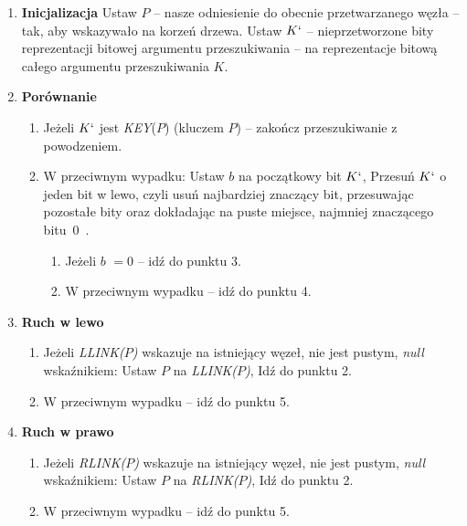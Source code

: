 	\begin{enumerate}
		\item \textbf{Inicjalizacja} \newline 
		Ustaw $P$ -- nasze odniesienie do obecnie przetwarzanego węzła -- tak, aby wskazywało na korzeń drzewa. \newline
		Ustaw $K`$ -- nieprzetworzone bity reprezentacji bitowej argumentu przeszukiwania -- na reprezentacje bitową całego argumentu przeszukiwania $K$.
		\item \textbf{Porównanie} 
		\begin{enumerate}
			\item Jeżeli $K`$ jest \emph{KEY}($P$) (kluczem $P$) -- zakończ przeszukiwanie z powodzeniem.
			\item W przeciwnym wypadku: \newline
			Ustaw $b$ na początkowy bit $K`$, \newline
			Przesuń $K`$ o jeden bit w lewo, czyli usuń najbardziej znaczący bit, przesuwając pozostałe bity oraz dokładając na puste miejsce, najmniej znaczącego bitu~$0$~\cite{inteviewCakeJavaBitShifting}.
			\begin{enumerate}
				\item Jeżeli $b$ $=0$ -- idź do punktu 3.
				\item W przeciwnym wypadku -- idź do punktu 4.
			\end{enumerate}
		\end{enumerate}
		\item \textbf{Ruch w lewo} 
		\begin{enumerate}
			\item Jeżeli \emph{LLINK($P$)} wskazuje na istniejący węzeł, nie jest pustym, \emph{null} wskaźnikiem: \newline
			Ustaw $P$ na \emph{LLINK($P$)}, \newline
			Idź do punktu 2.
			\item W przeciwnym wypadku -- idź do punktu 5.
		\end{enumerate}
		\item \textbf{Ruch w prawo} 
		\begin{enumerate}
			\item Jeżeli \emph{RLINK($P$)} wskazuje na istniejący węzeł, nie jest pustym, \emph{null} wskaźnikiem: \newline
			Ustaw $P$ na \emph{RLINK($P$)}, \newline
			Idź do punktu 2.
			\item W przeciwnym wypadku -- idź do punktu 5. 

\end{enumerate}
\end{enumerate}
